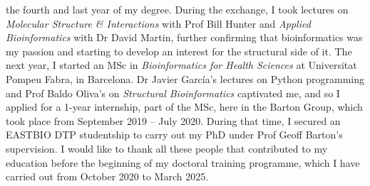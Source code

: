 the fourth and last year of my degree. During the exchange, I took lectures on \textit{Molecular Structure \& Interactions} with Prof Bill Hunter and \textit{Applied Bioinformatics} with Dr David Martin, further confirming that bioinformatics was my passion and starting to develop an interest for the structural side of it. The next year, I started an MSc in \textit{Bioinformatics for Health Sciences} at Universitat Pompeu Fabra, in Barcelona. Dr Javier García's lectures on Python programming and Prof Baldo Oliva's on \textit{Structural Bioinformatics} captivated me, and so I applied for a 1-year internship, part of the MSc, here in the Barton Group, which took place from September 2019 -- July 2020. During that time, I secured an EASTBIO DTP studentship to carry out my PhD under Prof Geoff Barton's supervision. I would like to thank all these people that contributed to my education before the beginning of my doctoral training programme, which I have carried out from October 2020 to March 2025.





























